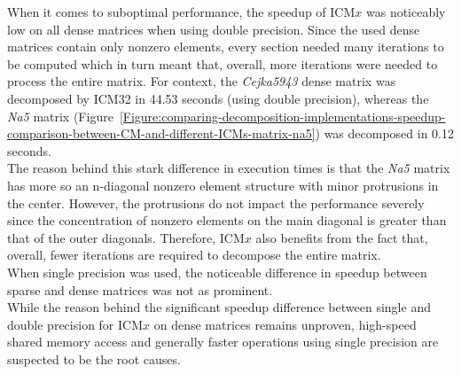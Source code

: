 When it comes to suboptimal performance, the speedup of ICM$ x $ was noticeably low on all dense matrices when using double precision. Since the used dense matrices contain only nonzero elements, every section needed many iterations to be computed which in turn meant that, overall, more iterations were needed to process the entire matrix. For context, the \textit{Cejka5943} dense matrix was decomposed by ICM32 in 44.53 seconds (using double precision), whereas the \textit{Na5} matrix (Figure~\ref{Figure:comparing-decomposition-implementations-speedup-comparison-between-CM-and-different-ICMs-matrix-na5}) was decomposed in 0.12 seconds. \\
The reason behind this stark difference in execution times is that the \textit{Na5} matrix has more so an n-diagonal nonzero element structure with minor protrusions in the center. However, the protrusions do not impact the performance severely since the concentration of nonzero elements on the main diagonal is greater than that of the outer diagonals. Therefore, ICM$ x $ also benefits from the fact that, overall, fewer iterations are required to decompose the entire matrix. \\
When single precision was used, the noticeable difference in speedup between sparse and dense matrices was not as prominent. \\
While the reason behind the significant speedup difference between single and double precision for ICM$ x $ on dense matrices remains unproven, high-speed shared memory access and generally faster operations using single precision are suspected to be the root causes.

